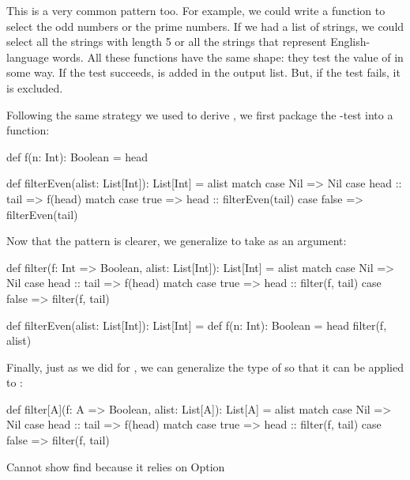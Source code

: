 \documentclass[9pt]{extbook}
\begin{document}
This is a very common pattern too. For example, we could write a function to
select the odd numbers or the prime numbers. If we had a list of strings, we
could select all the strings with length 5 or all the strings that represent
English-language words. All these functions have the same shape: they test
the value of  in some way. If the test succeeds,  is added in
the output list. But, if the test fails, it is excluded.

Following the same strategy we used to derive , we first package
the -test into a function:

\begin{scalacode}
def f(n: Int): Boolean = head %

def filterEven(alist: List[Int]): List[Int] = alist match {
  case Nil => Nil
  case head :: tail =>
    f(head) match {
      case true => head :: filterEven(tail)
      case false => filterEven(tail)
    }
}
\end{scalacode}

Now that the pattern is clearer, we generalize  to take 
as an argument:

\begin{scalacode}
def filter(f: Int => Boolean, alist: List[Int]): List[Int] = alist match {
  case Nil => Nil
  case head :: tail =>
    f(head) match {
      case true => head :: filter(f, tail)
      case false => filter(f, tail)
    }
}

def filterEven(alist: List[Int]): List[Int] = {
  def f(n: Int): Boolean = head %
  filter(f, alist)
}
\end{scalacode}

Finally, just as we did for , we can generalize the type of 
so that it can be applied to :

\begin{scalacode}
def filter[A](f: A => Boolean, alist: List[A]): List[A] = alist match {
  case Nil => Nil
  case head :: tail =>
    f(head) match {
      case true => head :: filter(f, tail)
      case false => filter(f, tail)
    }
}
\end{scalacode}

\begin{instructor}
Cannot show find because it relies on Option
\end{instructor}

\end{document}
